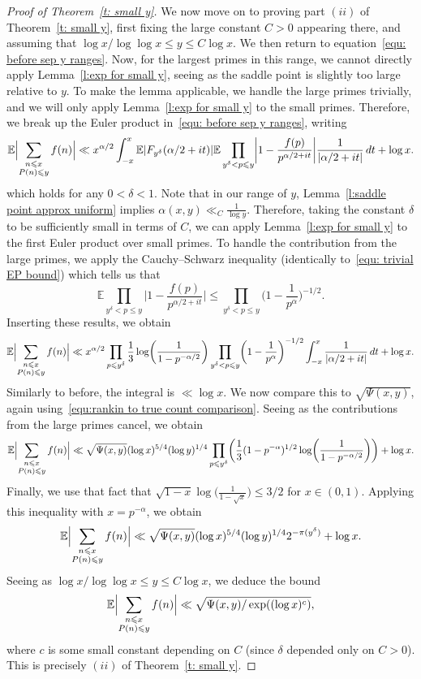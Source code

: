 \documentclass[12pt,a4paper,reqno]{amsart}
\numberwithin{equation}{section}
\def\E{\mathbb E}
\def\leq {\leqslant}
\theoremstyle{remark}
\theoremstyle{definition}
\numberwithin{equation}{section}
\theoremstyle{remark}
\def\E{\mathbb E}
\begin{document}
\begin{proof}[Proof of Theorem~\ref{t: small y}]
We now move on to proving part $(ii)$ of Theorem~\ref{t: small y}, first fixing the large constant $C>0$ appearing there, and assuming that $\log x / \log \log x \leq y \leq C \log x$. We then return to equation~\eqref{equ: before sep y ranges}. Now, for the largest primes in this range, we cannot directly apply Lemma~\ref{l:exp for small y}, seeing as the saddle point is slightly too large relative to $y$. To make the lemma applicable, we handle the large primes trivially, and we will only apply Lemma~\ref{l:exp for small y} to the small primes. Therefore, we break up the Euler product in~\eqref{equ: before sep y ranges}, writing
\[
\E \Bigl| \sum_{\substack{n \leq x \\ P(n) \leq y}} f(n) \Bigr| \ll  x^{\alpha/2} \int_{-x}^{x} \E |F_{y^{\delta}} (\alpha / 2 + it) | \E \prod_{y^{\delta} < p \leq y} \biggl| 1 - \frac{f(p)}{p^{\alpha/2 + it}} \biggr| \frac{1}{|\alpha / 2 + it|} \, dt + \log x .
\]
which holds for any $0 < \delta < 1$. Note that in our range of $y$, Lemma~\ref{l:saddle point approx uniform} implies $\alpha (x,y) \ll_C \frac{1}{\log y}$. Therefore, taking the constant $\delta$ to be sufficiently small in terms of $C$, we can apply Lemma~\ref{l:exp for small y} to the first Euler product over small primes. To handle the contribution from the large primes, we apply the Cauchy--Schwarz inequality (identically to~\eqref{equ: trivial EP bound}) which tells us that 
\[
\E \prod_{y^{\delta} < p \leq y}  \biggl| 1 - \frac{f(p)}{p^{\alpha/2 + it}} \biggr| \leq \prod_{y^{\delta} < p \leq y} \biggl( 1 - \frac{1}{p^{\alpha}} \biggr)^{-1/2} .
\]
Inserting these results, we obtain
\[
\E \Bigl| \sum_{\substack{n \leq x \\ P(n) \leq y}} f(n) \Bigr| \ll  x^{\alpha/2} \prod_{p \leq y^{\delta}} \frac{1}{3} \log \biggl( \frac{1}{1 - p^{- \alpha / 2}} \biggr) \prod_{y^{\delta} < p \leq y} \biggl( 1 - \frac{1}{p^{\alpha}} \biggr)^{-1/2}  \int_{-x}^{x}\frac{1}{|\alpha / 2 + it|} \, dt + \log x .
\]
Similarly to before, the integral is $\ll \log x$. We now compare this to $\sqrt{\Psi(x,y)}$, again using~\eqref{equ:rankin to true count comparison}. Seeing as the contributions from the large primes cancel, we obtain
\[
\E \Bigl| \sum_{\substack{n \leq x \\ P(n) \leq y}} f(n) \Bigr| \ll  \sqrt{\Psi(x,y)} (\log x)^{5/4} (\log y)^{1/4} \prod_{p \leq y^{\delta}} \biggl( \frac{1}{3} (1 - p^{-\alpha})^{1/2} \log \biggl( \frac{1}{1 - p^{- \alpha / 2}} \biggr) \biggr)  + \log x .
\]
Finally, we use that fact that $\sqrt{1 - x} \log \bigl( \frac{1}{1-\sqrt{x}} \bigr) \leq 3/2$ for $x \in (0,1)$. Applying this inequality with $x = p^{-\alpha}$, we obtain
\[
\E \Bigl| \sum_{\substack{n \leq x \\ P(n) \leq y}} f(n) \Bigr| \ll  \sqrt{\Psi(x,y)} (\log x)^{5/4} (\log y)^{1/4} 2^{- \pi (y^{\delta})}  + \log x .
\]
Seeing as $\log x / \log \log x \leq y \leq C \log x$, we deduce the bound
\[
\E \Bigl| \sum_{\substack{n \leq x \\ P(n) \leq y}} f(n) \Bigr| \ll \sqrt{\Psi (x,y)/\exp ((\log x)^{c})}, 
\]
where $c$ is some small constant depending on $C$ (since $\delta$ depended only on $C>0$). This is precisely $(ii)$ of Theorem~\ref{t: small y}.


\end{proof}
\end{document}
